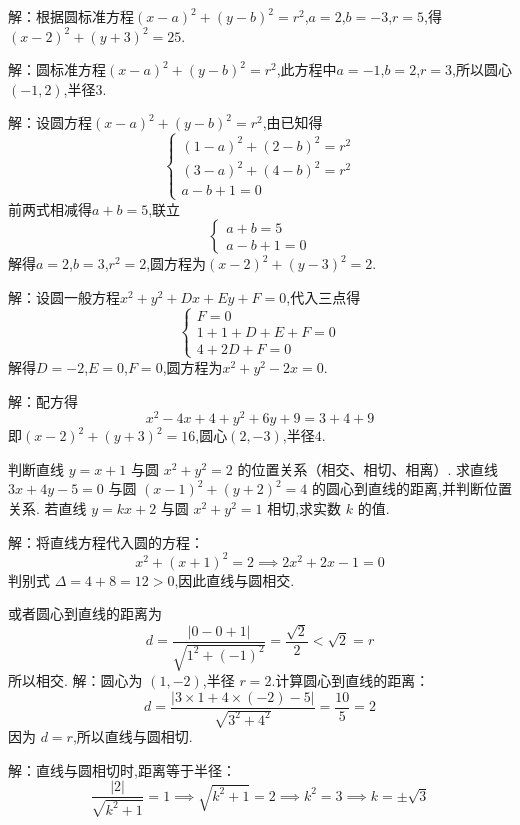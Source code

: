 \documentclass{ctexart}
\newenvironment{MyAnswer}[1][] %
{
    \begin{tcolorbox}[breakable, colframe=blue]
    \begin{Answer}[#1] \color{blue} \kaishu
        }  %
    {\end{Answer}
\end{tcolorbox}
}
\begin{document}
\begin{MyAnswer}[ref={ex:circle-properties}]
    \Question 解：根据圆标准方程$(x - a)^2+(y - b)^2 = r^2$,$a = 2$,$b=-3$,$r = 5$,得$(x - 2)^2+(y + 3)^2 = 25$.
    
    \Question 解：圆标准方程$(x - a)^2+(y - b)^2 = r^2$,此方程中$a=-1$,$b = 2$,$r = 3$,所以圆心$(-1,2)$,半径$3$.
    
    \Question 解：设圆方程$(x - a)^2+(y - b)^2 = r^2$,由已知得
    $$
    \begin{cases}
    (1 - a)^2+(2 - b)^2 = r^2 \\
    (3 - a)^2+(4 - b)^2 = r^2 \\
    a - b+1 = 0
    \end{cases}
    $$
    前两式相减得$a + b = 5$,联立
    $$
    \begin{cases}
    a + b = 5 \\
    a - b+1 = 0
    \end{cases}
    $$
    解得$a = 2$,$b = 3$,$r^2 = 2$,圆方程为$(x - 2)^2+(y - 3)^2 = 2$.
    
    \Question 解：设圆一般方程$x^{2}+y^{2}+Dx + Ey+F = 0$,代入三点得
    $$
    \begin{cases}
    F = 0 \\
    1 + 1+D + E+F = 0 \\
    4+2D+F = 0
    \end{cases}
    $$
    解得$D=-2$,$E = 0$,$F = 0$,圆方程为$x^{2}+y^{2}-2x = 0$.
    
    \Question 解：配方得
    $$
    x^{2}-4x + 4+y^{2}+6y+9=3 + 4+9
    $$
    即$(x - 2)^2+(y + 3)^2 = 16$,圆心$(2,-3)$,半径$4$.
\end{MyAnswer}

\clearpage
\begin{Exercise}[title={直线与圆的位置关系小练习}, label={ex:line-circle}]
    \Question 判断直线 $ y = x + 1 $ 与圆 $ x^2 + y^2 = 2 $ 的位置关系（相交、相切、相离）.
    \Question 求直线 $ 3x + 4y - 5 = 0 $ 与圆 $ (x-1)^2 + (y+2)^2 = 4 $ 的圆心到直线的距离,并判断位置关系.
    \Question 若直线 $ y = kx + 2 $ 与圆 $ x^2 + y^2 = 1 $ 相切,求实数 $ k $ 的值.
\end{Exercise}
\begin{MyAnswer}[ref={ex:line-circle}]
        \Question 解：将直线方程代入圆的方程：
        $$
        x^2 + (x + 1)^2 = 2 \implies 2x^2 + 2x - 1 = 0
        $$
        判别式 $ \Delta = 4 + 8 = 12 > 0 $,因此直线与圆相交.

        或者圆心到直线的距离为 
        $$    
        d = \frac{|0-0+1|}{\sqrt{1^2 + (-1)^2}} = \frac{\sqrt{2}}{2} < \sqrt{2} =r
        $$
        所以相交.
        \Question 解：圆心为 $ (1, -2) $,半径 $ r = 2 $.计算圆心到直线的距离：
        $$
        d = \frac{|3 \times 1 + 4 \times (-2) - 5|}{\sqrt{3^2 + 4^2}} = \frac{10}{5} = 2
        $$
        因为 $ d = r $,所以直线与圆相切.

        \Question 解：直线与圆相切时,距离等于半径：
        $$
        \frac{|2|}{\sqrt{k^2 + 1}} = 1 \implies \sqrt{k^2 + 1} = 2 \implies k^2 = 3 \implies k = \pm \sqrt{3}
        $$
\end{MyAnswer}
\end{document}

